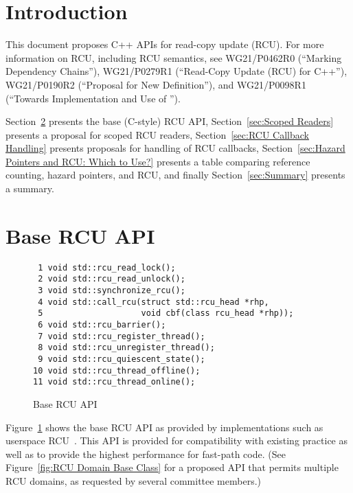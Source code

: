 \documentclass[letterpaper,twocolumn,10pt]{article}
\begin{document}
\section{Introduction}
\label{sec:Introduction}

This document proposes C++ APIs for read-copy update (RCU).
For more information on RCU, including RCU semantics, see
WG21/P0462R0 (``Marking  Dependency Chains''),
WG21/P0279R1 (``Read-Copy Update (RCU) for C++''),
WG21/P0190R2 (``Proposal for New  Definition''),
and
WG21/P0098R1 (``Towards Implementation and Use of '').

Section~\ref{sec:Base RCU API} presents the base (C-style) RCU API,
Section~\ref{sec:Scoped Readers} presents a proposal for scoped RCU readers,
Section~\ref{sec:RCU Callback Handling} presents proposals for handling of
RCU callbacks,
Section~\ref{sec:Hazard Pointers and RCU: Which to Use?} presents a
table comparing reference counting, hazard pointers, and RCU, and finally
Section~\ref{sec:Summary} presents a summary.

\section{Base RCU API}
\label{sec:Base RCU API}

\begin{figure}[tbp]
{ \scriptsize
\begin{verbatim}
 1 void std::rcu_read_lock();
 2 void std::rcu_read_unlock();
 3 void std::synchronize_rcu();
 4 void std::call_rcu(struct std::rcu_head *rhp,
 5                    void cbf(class rcu_head *rhp));
 6 void std::rcu_barrier();
 7 void std::rcu_register_thread();
 8 void std::rcu_unregister_thread();
 9 void std::rcu_quiescent_state();
10 void std::rcu_thread_offline();
11 void std::rcu_thread_online();
\end{verbatim}
}
\caption{Base RCU API}
\label{fig:Base RCU API}
\end{figure}

Figure~\ref{fig:Base RCU API}
shows the base RCU API as provided by implementations such as
userspace RCU~\cite{MathieuDesnoyers2009URCU,PaulMcKenney2013LWNURCU}.
This API is provided for compatibility with existing practice as
well as to provide the highest performance for fast-path code.
(See Figure~\ref{fig:RCU Domain Base Class} for a proposed API that
permits multiple RCU domains, as requested by several committee members.)
\end{document}
